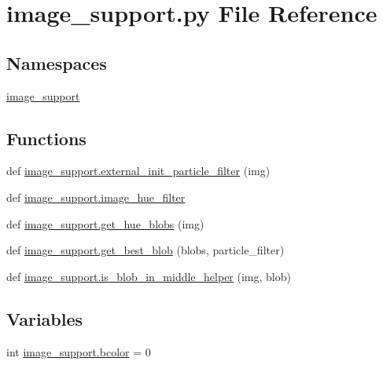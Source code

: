 \section{image\+\_\+support.\+py File Reference}
\label{image__support_8py}
\subsection*{Namespaces}
\begin{DoxyCompactItemize}
\item 
 \hyperlink{namespaceimage__support}{image\+\_\+support}
\end{DoxyCompactItemize}
\subsection*{Functions}
\begin{DoxyCompactItemize}
\item 
def \hyperlink{namespaceimage__support_a45e637a8685d23a453229102a4346327}{image\+\_\+support.\+external\+\_\+init\+\_\+particle\+\_\+filter} (img)
\item 
def \hyperlink{namespaceimage__support_aff0422e55f0d6119a012115570442c3f}{image\+\_\+support.\+image\+\_\+hue\+\_\+filter}
\item 
def \hyperlink{namespaceimage__support_aaa6d938c26b4ad5878e1bfb6870e749b}{image\+\_\+support.\+get\+\_\+hue\+\_\+blobs} (img)
\item 
def \hyperlink{namespaceimage__support_a0cebf9b300caec4b9e3f7725204f7f63}{image\+\_\+support.\+get\+\_\+best\+\_\+blob} (blobs, particle\+\_\+filter)
\item 
def \hyperlink{namespaceimage__support_ae76ebc019a04c735f46210bc29e55f76}{image\+\_\+support.\+is\+\_\+blob\+\_\+in\+\_\+middle\+\_\+helper} (img, blob)
\end{DoxyCompactItemize}
\subsection*{Variables}
\begin{DoxyCompactItemize}
\item 
int \hyperlink{namespaceimage__support_a1cfece0a81077dca0136b23884fb318d}{image\+\_\+support.\+bcolor} = 0
\end{DoxyCompactItemize}
